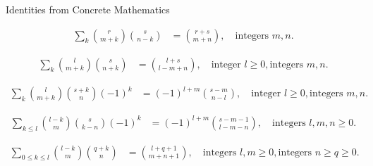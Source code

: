﻿Identities from Concrete Mathematics~\cite[p. 169]{graham1994concrete}
\begin{identity}
    \begin{align*}
        \sum_{k} \binom{r}{m+k} \binom{s}{n-k} &= \binom{r+s}{m+n}, \quad \text{integers } m, n.
    \end{align*}
\end{identity}

\begin{identity}
    \begin{align*}
        \sum_{k} \binom{l}{m+k} \binom{s}{n+k} &= \binom{l+s}{l-m+n}, \quad \text{integer } l \geq 0, \text{integers } m, n.
    \end{align*}
\end{identity}

\begin{identity}
    \begin{align*}
        \sum_{k} \binom{l}{m+k} \binom{s+k}{n} (-1)^k &= (-1)^{l+m} \binom{s-m}{n-l}, \quad \text{integer } l \geq 0, \text{integers } m, n.
    \end{align*}
\end{identity}

\begin{identity}
    \begin{align*}
        \sum_{k \leq l} \binom{l-k}{m} \binom{s}{k-n} (-1)^k &= (-1)^{l+m} \binom{s-m-1}{l-m-n}, \quad \text{integers } l, m, n \geq 0.
    \end{align*}
\end{identity}

\begin{identity}
    \begin{align*}
        \sum_{0 \leq k \leq l} \binom{l-k}{m} \binom{q+k}{n} &= \binom{l+q+1}{m+n+1}, \quad \text{integers } l, m \geq 0, \text{integers } n \geq q \geq 0.
    \end{align*}
\end{identity}





\clearpage
